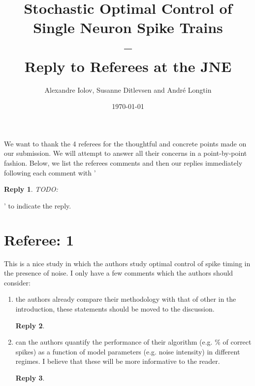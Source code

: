 \documentclass{article}
\newtheorem*{rep}{Reply}
\begin{document}
\title{Stochastic Optimal Control of Single Neuron Spike Trains\\
--\\
Reply to Referees at the JNE} 

\author{Alexandre Iolov, 
Susanne Ditlevsen 
and
Andr\'e Longtin
}

\date{\today}

\maketitle 



\vskip 20pt

We want to thank the 4 referees for the thoughtful and concrete points made on
our submission. We will attempt to answer all their concerns in a point-by-point
fashion. Below, we list the referees comments and then our replies immediately
following each comment with '\begin{rep} TODO: \end{rep}' to indicate the reply.  

\tableofcontents

\clearpage
\section{Referee: 1}
This is a nice study in which the authors study optimal control of spike timing in the presence of noise. I only have a few comments which the authors should consider:

\begin{enumerate}
\item the authors already compare their methodology with that of other in the
introduction, these statements should be moved to the discussion.
\begin{rep}

\end{rep}

\item can the authors quantify the performance of their algorithm (e.g. \% of
correct spikes) as a function of model parameters (e.g. noise intensity) in
different regimes. I believe that these will be more informative to the reader.
\begin{rep}

\end{rep}
\end{enumerate}
\end{document}
